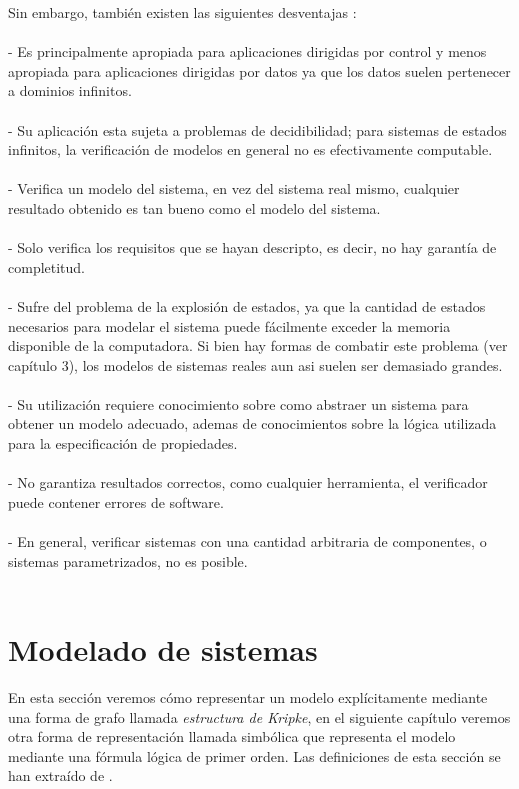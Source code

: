 Sin embargo, también existen las siguientes desventajas \cite{Baier:2}:\\
\\
- Es principalmente apropiada para aplicaciones dirigidas por control y menos apropiada para aplicaciones dirigidas por datos ya que los datos suelen pertenecer a dominios infinitos.\\
\\
- Su aplicación esta sujeta a problemas de decidibilidad; para sistemas de estados infinitos, la verificación de modelos en general no es efectivamente computable.\\
\\
- Verifica un modelo del sistema, en vez del sistema real mismo, cualquier resultado obtenido es tan bueno como el modelo del sistema.\\
\\
- Solo verifica los requisitos que se hayan descripto, es decir, no hay garantía de completitud.\\
\\
- Sufre del problema de la explosión de estados, ya que la cantidad de estados necesarios para modelar el sistema puede fácilmente exceder la memoria disponible de la computadora. Si bien hay formas de combatir este problema (ver capítulo 3), los modelos de sistemas reales aun asi suelen ser demasiado grandes.\\
\\
- Su utilización requiere conocimiento sobre como abstraer un sistema para obtener un modelo adecuado, ademas de conocimientos sobre la lógica utilizada para la especificación de propiedades.\\
\\
- No garantiza resultados correctos, como cualquier herramienta, el verificador puede contener errores de software.\\
\\
- En general, verificar sistemas con una cantidad arbitraria de componentes, o sistemas parametrizados, no es posible.\\
\\
\section{Modelado de sistemas}
En esta sección veremos cómo representar un modelo explícitamente mediante una forma de grafo llamada \emph{estructura de Kripke}, en el siguiente capítulo veremos otra forma de representación llamada simbólica que representa el modelo mediante una fórmula lógica de primer orden. Las definiciones de esta sección se han extraído de \cite{Clarke:1}.

